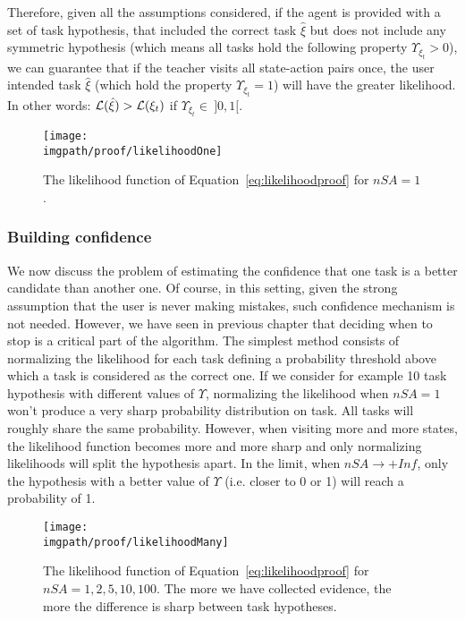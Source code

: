 Therefore, given all the assumptions considered, if the agent is provided with a set of task hypothesis, that included the correct task $\hat{\xi}$ but does not include any symmetric hypothesis (which means all tasks hold the following property $\Upsilon_{\xi_t} > 0$), we can guarantee that if the teacher visits all state-action pairs once, the user intended task $\hat{\xi}$ (which hold the property $\Upsilon_{\xi_t} = 1$) will have the greater likelihood. In other words: $\mathcal{L}(\hat{\xi}) > \mathcal{L}(\xi_t)$ if $\Upsilon_{\xi_t} \in~]0,1[$.

\begin{figure}[!htbp]
\centering
\texttt{[image: \\imgpath/proof/likelihoodOne]}
\caption{The likelihood function of Equation~\ref{eq:likelihoodproof} for $nSA =1$.}
\label{fig:prooflikelihoodone}
\end{figure}

\subsubsection*{Building confidence}

We now discuss the problem of estimating the confidence that one task is a better candidate than another one. Of course, in this setting, given the strong assumption that the user is never making mistakes, such confidence mechanism is not needed. However, we have seen in previous chapter that deciding when to stop is a critical part of the algorithm. The simplest method consists of normalizing the likelihood for each task defining a probability threshold above which a task is considered as the correct one. If we consider for example 10 task hypothesis with different values of $\Upsilon$, normalizing the likelihood when $nSA = 1$ won't produce a very sharp probability distribution on task. All tasks will roughly share the same probability. However, when visiting more and more states, the likelihood function becomes more and more sharp and only normalizing likelihoods will split the hypothesis apart. In the limit, when $nSA \rightarrow +Inf$, only the hypothesis with a better value of $\Upsilon$ (i.e. closer to 0 or 1) will reach a probability of 1.

\begin{figure}[!htbp]
\centering
\texttt{[image: \\imgpath/proof/likelihoodMany]}
\caption{The likelihood function of Equation~\ref{eq:likelihoodproof} for $nSA =1,2,5,10,100$. The more we have collected evidence, the more the difference is sharp between task hypotheses.}
\label{fig:prooflikelihoodmany}
\end{figure}

